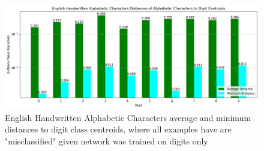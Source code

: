 



\begin{figure}[ht]
    \centering
    \includegraphics[width=0.99\columnwidth]{Figures/Results/HandwrittenCharacters/english_handwritten_characters_alphabetic_only_thresholds.png}
    \caption{English Handwritten Alphabetic Characters average and minimum distances to digit class centroids, where all examples have are "misclassified" given network was trained on digits only}
\label{fig:english_handwritten_characters_alphabetic_only_thresholds}
\end{figure}

